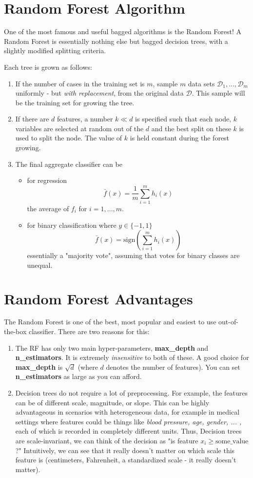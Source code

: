 \documentclass[12pt]{article}
\begin{document}
\section{Random Forest Algorithm}
One of the most famous and useful bagged algorithms is the Random Forest! A Random Forest is essentially nothing else but bagged decision trees, with a slightly modified splitting criteria.

Each tree is grown as follows:
\begin{enumerate}
    \item If the number of cases in the training set is $m$, sample $m$ data sets $\mathcal{D}_1, \dots, \mathcal{D}_m$ uniformly - but \textit{with replacement}, from the original data $\mathcal{D}$. This sample will be the training set for growing the tree.
    \item If there are $d$ features, a number $k \ll d$ is specified such that each node, $k$ variables are selected at random out of the $d$ and the best split on these $k$ is used to split the node. The value of $k$ is held constant during the forest growing.
    \item The final aggregate classifier can be
\begin{itemize}
    \item for regression
    $$\bar{f}(x) = \frac{1}{m} \sum_{i=1}^{m} h_i(x)$$
    the average of $f_i$ for $i =1,\dots,m$.
    \item for binary classification where $y \in \{-1,1\}$
    $$\bar{f}(x) = \text{sign}(\sum_{i=1}^{m} h_i(x))$$
    essentially a "majority vote", assuming that votes for binary classes are unequal.
\end{itemize}
\end{enumerate}

\section{Random Forest Advantages}
The Random Forest is one of the best, most popular and easiest to use out-of-the-box classifier. There are two reasons for this:

\begin{enumerate}
    \item The RF has only two main hyper-parameters, \textbf{max\_depth} and \textbf{n\_estimators}. It is extremely \textit{insensitive} to both of these. A good choice for \textbf{max\_depth} is $\sqrt{d}$ (where $d$ denotes the number of features). You can set \textbf{n\_estimators} as large as you can afford.
    \item Decision trees do not require a lot of preprocessing. For example, the features can be of different scale, magnitude, or slope. This can be highly advantageous in scenarios with heterogeneous data, for example in medical settings where features could be things like \textit{blood pressure, age, gender, ... ,} each of which is recorded in completely different units. Thus, Decision trees are scale-invariant, we can think of the decision as "is feature $x_i \geq \text{some\_value}$?" Intuitively, we can see that it really doesn't matter on which scale this feature is (centimeters, Fahrenheit, a standardized scale - it really doesn't matter). 
\end{enumerate}
\end{document}
